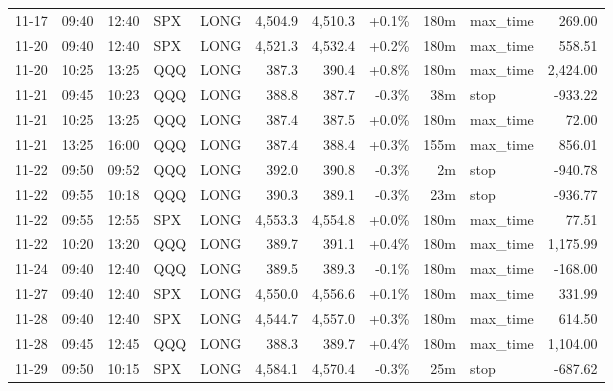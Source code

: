 \documentclass[11pt,a4paper,twoside]{article}
\begin{document}
\begin{center}
\begin{longtable}{>{\color{txtmain}}l l l l l r r r r >{\color{txtmain}}l r}
11-17 & 09:40 & 12:40 & SPX & LONG & 4,504.9 & 4,510.3 & \textcolor{wingreen}{+0.1\%} & 180m & max\_time & \textcolor{wingreen}{269.00} \\
11-20 & 09:40 & 12:40 & SPX & LONG & 4,521.3 & 4,532.4 & \textcolor{wingreen}{+0.2\%} & 180m & max\_time & \textcolor{wingreen}{558.51} \\
11-20 & 10:25 & 13:25 & QQQ & LONG & 387.3 & 390.4 & \textcolor{wingreen}{+0.8\%} & 180m & max\_time & \textcolor{wingreen}{2,424.00} \\
11-21 & 09:45 & 10:23 & QQQ & LONG & 388.8 & 387.7 & \textcolor{lossred}{-0.3\%} & 38m & stop & \textcolor{lossred}{-933.22} \\
11-21 & 10:25 & 13:25 & QQQ & LONG & 387.4 & 387.5 & \textcolor{wingreen}{+0.0\%} & 180m & max\_time & \textcolor{wingreen}{72.00} \\
11-21 & 13:25 & 16:00 & QQQ & LONG & 387.4 & 388.4 & \textcolor{wingreen}{+0.3\%} & 155m & max\_time & \textcolor{wingreen}{856.01} \\
11-22 & 09:50 & 09:52 & QQQ & LONG & 392.0 & 390.8 & \textcolor{lossred}{-0.3\%} & 2m & stop & \textcolor{lossred}{-940.78} \\
11-22 & 09:55 & 10:18 & QQQ & LONG & 390.3 & 389.1 & \textcolor{lossred}{-0.3\%} & 23m & stop & \textcolor{lossred}{-936.77} \\
11-22 & 09:55 & 12:55 & SPX & LONG & 4,553.3 & 4,554.8 & \textcolor{wingreen}{+0.0\%} & 180m & max\_time & \textcolor{wingreen}{77.51} \\
11-22 & 10:20 & 13:20 & QQQ & LONG & 389.7 & 391.1 & \textcolor{wingreen}{+0.4\%} & 180m & max\_time & \textcolor{wingreen}{1,175.99} \\
11-24 & 09:40 & 12:40 & QQQ & LONG & 389.5 & 389.3 & \textcolor{lossred}{-0.1\%} & 180m & max\_time & \textcolor{lossred}{-168.00} \\
11-27 & 09:40 & 12:40 & SPX & LONG & 4,550.0 & 4,556.6 & \textcolor{wingreen}{+0.1\%} & 180m & max\_time & \textcolor{wingreen}{331.99} \\
11-28 & 09:40 & 12:40 & SPX & LONG & 4,544.7 & 4,557.0 & \textcolor{wingreen}{+0.3\%} & 180m & max\_time & \textcolor{wingreen}{614.50} \\
11-28 & 09:45 & 12:45 & QQQ & LONG & 388.3 & 389.7 & \textcolor{wingreen}{+0.4\%} & 180m & max\_time & \textcolor{wingreen}{1,104.00} \\
11-29 & 09:50 & 10:15 & SPX & LONG & 4,584.1 & 4,570.4 & \textcolor{lossred}{-0.3\%} & 25m & stop & \textcolor{lossred}{-687.62} \\

\end{longtable}
\end{center}
\end{document}
